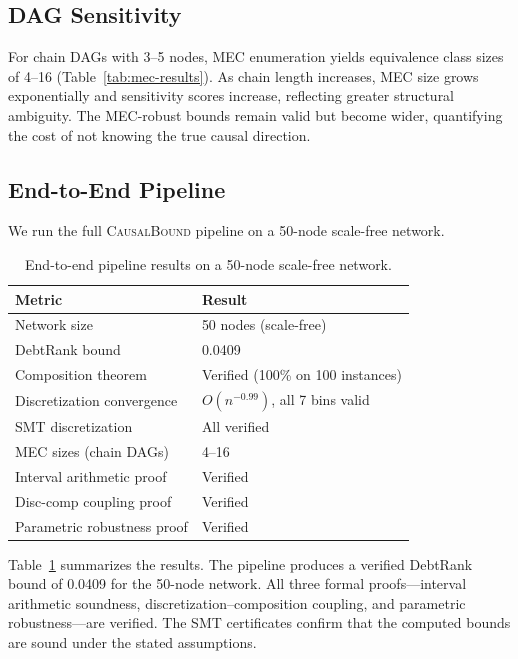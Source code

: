 \documentclass[11pt,a4paper]{article}
\newcommand{\CausalBound}{\textsc{CausalBound}}
\begin{document}
\subsection{DAG Sensitivity}
\label{sec:exp-sensitivity}

For chain DAGs with 3--5 nodes, MEC enumeration yields equivalence class sizes of 4--16 (Table~\ref{tab:mec-results}). As chain length increases, MEC size grows exponentially and sensitivity scores increase, reflecting greater structural ambiguity. The MEC-robust bounds remain valid but become wider, quantifying the cost of not knowing the true causal direction.

\subsection{End-to-End Pipeline}
\label{sec:exp-e2e}

We run the full \CausalBound{} pipeline on a 50-node scale-free network.

\begin{table}[t]
\centering
\caption{End-to-end pipeline results on a 50-node scale-free network.}
\label{tab:e2e}
\begin{tabular}{@{}ll@{}}
\toprule
\textbf{Metric} & \textbf{Result} \\
\midrule
Network size & 50 nodes (scale-free) \\
DebtRank bound & 0.0409 \\
Composition theorem & Verified (100\% on 100 instances) \\
Discretization convergence & $O(n^{-0.99})$, all 7 bins valid \\
SMT discretization & All verified \\
MEC sizes (chain DAGs) & 4--16 \\
Interval arithmetic proof & Verified \\
Disc-comp coupling proof & Verified \\
Parametric robustness proof & Verified \\
\bottomrule
\end{tabular}
\end{table}

Table~\ref{tab:e2e} summarizes the results. The pipeline produces a verified DebtRank bound of 0.0409 for the 50-node network. All three formal proofs---interval arithmetic soundness, discretization--composition coupling, and parametric robustness---are verified. The SMT certificates confirm that the computed bounds are sound under the stated assumptions.
\end{document}

